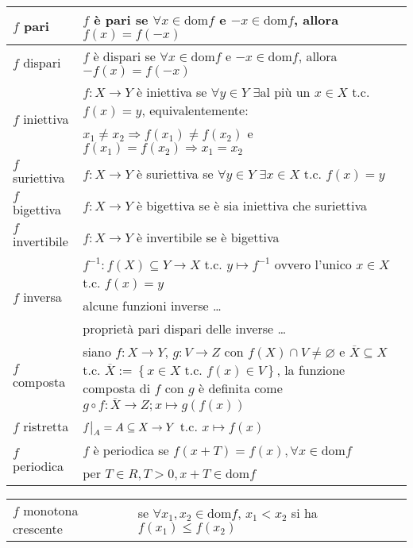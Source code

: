 \documentclass[a4paper]{article}
\newcommand\restr[2]{{%
	\left.\kern-\nulldelimiterspace %
	#1 %
	\vphantom{\big|} %
	\right|_{#2} %
	}}
\newcommand\dom{\text{dom}}
\begin{document}
\begin{center}
	\begin{tabularx}{\textwidth}{l X}
		\toprule
		\(f\) pari & \(f\) è pari se \(\forall x \in \dom f\) e \(-x \in \dom f\), allora \(f(x) = f(-x)\) \\
		\midrule
		\(f\) dispari & \(f\) è dispari se \(\forall x \in \dom f\) e \(-x \in \dom f\), allora \(-f(x) = f(-x)\)\\
		\midrule
		\multirow{2}{*}{\(f\) iniettiva} & \(f:X \to Y\) è iniettiva se \(\forall y \in Y\) \(\exists\)al più un \(x \in X\) t.c. \(f(x) = y\), equivalentemente: \\
		& \(x_1 \neq x_2 \Rightarrow f(x_1) \neq f(x_2)\) e \(f(x_1) = f(x_2) \Rightarrow x_1 = x_2\) \\
		\midrule
		\(f\) suriettiva & \(f:X \to Y\) è suriettiva se \(\forall y \in Y\) \(\exists x \in X\) t.c. \(f(x) = y\) \\
		\midrule
		\(f\) bigettiva & \(f:X \to Y\) è bigettiva se è sia iniettiva che suriettiva \\
		\midrule
		\(f\) invertibile & \(f:X \to Y\) è invertibile se è bigettiva \\
		\midrule
		\multirow{3}{*}{\(f\) inversa} & \(f ^ {-1}:f(X) \subseteq Y \to X\) t.c. \(y \mapsto f ^ {-1}\) ovvero l'unico \(x \in X\) t.c. \(f(x) = y\) \\
		& alcune funzioni inverse \dots \\
		& proprietà pari dispari delle inverse \dots \\
		\midrule
		\(f\) composta & siano \(f:X \to Y\), \(g:V \to Z\) con \(f(X) \cap V \neq \varnothing\)
		e \(\overline{X} \subseteq X\) t.c. \(\overline{X} := \left\{ x \in X \text{ t.c. } f(x) \in V \right\}\),
		la funzione composta di \(f\) con \(g\) è definita come \(g \circ f : \overline{X} \to Z; x \mapsto g(f(x))\) \\
		\midrule
		\(f\) ristretta & \(\restr{f}{A} = A \subseteq X \to Y\) t.c. \(x \mapsto f(x)\) \\
		\midrule
		\multirow{2}{*}{\(f\) periodica} & \(f\) è periodica se \(f(x+T) = f(x), \forall x \in \dom f\) \\
		& per \(T \in R, T > 0, x + T \in \dom f\)\\
		\bottomrule
	\end{tabularx}
	\begin{tabularx}{\textwidth}{l X}
		\toprule
		\(f\) monotona crescente & se \(\forall x_1, x_2 \in \dom f\), \(x_1 < x_2\) si ha \(f(x_1) \leq f(x_2)\) \\

\end{tabularx}
\end{center}
\end{document}

